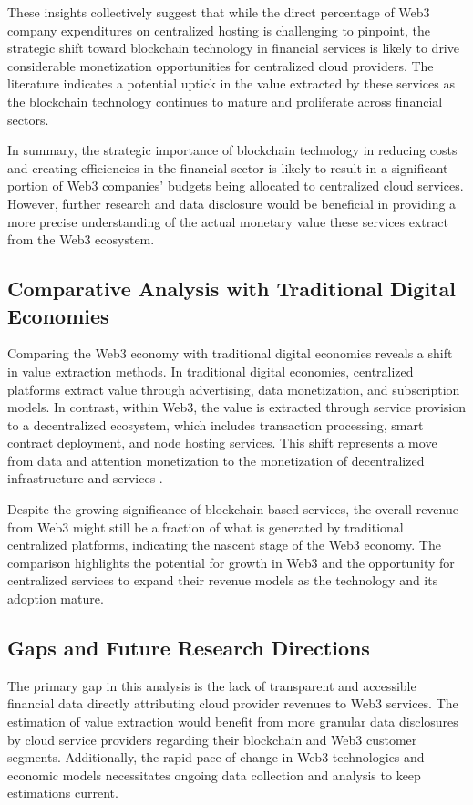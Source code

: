\documentclass{article}
\begin{document}
These insights collectively suggest that while the direct percentage of Web3 company expenditures on centralized hosting is challenging to pinpoint, the strategic shift toward blockchain technology in financial services is likely to drive considerable monetization opportunities for centralized cloud providers. The literature indicates a potential uptick in the value extracted by these services as the blockchain technology continues to mature and proliferate across financial sectors.

In summary, the strategic importance of blockchain technology in reducing costs and creating efficiencies in the financial sector is likely to result in a significant portion of Web3 companies' budgets being allocated to centralized cloud services. However, further research and data disclosure would be beneficial in providing a more precise understanding of the actual monetary value these services extract from the Web3 ecosystem.

\subsection{Comparative Analysis with Traditional Digital Economies}

Comparing the Web3 economy with traditional digital economies reveals a shift in value extraction methods. In traditional digital economies, centralized platforms extract value through advertising, data monetization, and subscription models. In contrast, within Web3, the value is extracted through service provision to a decentralized ecosystem, which includes transaction processing, smart contract deployment, and node hosting services. This shift represents a move from data and attention monetization to the monetization of decentralized infrastructure and services \cite{tapscott2016blockchain}.

Despite the growing significance of blockchain-based services, the overall revenue from Web3 might still be a fraction of what is generated by traditional centralized platforms, indicating the nascent stage of the Web3 economy. The comparison highlights the potential for growth in Web3 and the opportunity for centralized services to expand their revenue models as the technology and its adoption mature.

\subsection{Gaps and Future Research Directions}
The primary gap in this analysis is the lack of transparent and accessible financial data directly attributing cloud provider revenues to Web3 services. The estimation of value extraction would benefit from more granular data disclosures by cloud service providers regarding their blockchain and Web3 customer segments. Additionally, the rapid pace of change in Web3 technologies and economic models necessitates ongoing data collection and analysis to keep estimations current.
\end{document}
